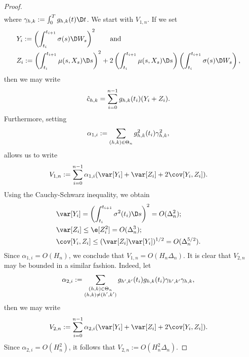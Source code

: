 \begin{proof}
\begin{align}
  \label{}
\end{align}
where $\gamma_{h,k} : = \int_0^T g_{h,k}(t) \D t$.  We start with $V_{1,n}$. If we set 
\begin{align}
  &Y_i := \left(\int^{t_{i+1}}_{t_i} \sigma(s) \D W_s\right)^2  \qquad \text{and} \notag\\
  &Z_i := \left(\int^{t_{i+1}}_{t_i} \mu(s, X_s) \D s\right)^2 + 2\left(\int^{t_{i+1}}_{t_i} \mu(s,X_s) \D s\right)\left(\int^{t_{i+1}}_{t_i} \sigma(s) \D W_s\right), \notag 
  \label{}
\end{align}
then we may write 
\begin{align}
  \hat{c}_{h,k} = \sum_{i = 0}^{n-1} g_{h,k}(t_i) (Y_i + Z_i).\notag
  \label{}
\end{align}
Furthermore, setting
\begin{align}
  \alpha_{1,i} := \sum_{(h,k) \in \Theta_n} g^2_{h,k}(t_i)\gamma_{h,k}^2,\notag
  \label{}
\end{align}
allows us to write 
\begin{align}
  V_{1,n} := \sum_{i = 0}^{n-1} \alpha_{1,i} (\var[Y_i] + \var[Z_i] + 2 \cov[Y_i,Z_i]). \notag
  \label{}
\end{align}
Using the Cauchy-Schwarz inequality, we obtain 
\begin{align}
    &\var[Y_i] = \left(\int^{t_{i+1}}_{t_i} \sigma^2(t_i) \D s\right)^2 = O(\Delta_n^2);\\
    &\var[Z_i] \le \e[Z_i^2] = O(\Delta_n^3); \\
    &\cov[Y_i, Z_i] \le (\var[Z_i] \var[Y_i])^{1/2} = O(\Delta_n^{5/2}).
\end{align}
Since $\alpha_{1,i} = O(H_n)$, we conclude that  $V_{1,n} = O(H_n\Delta_n)$. It is clear that $V_{2,n}$ may be bounded in a similar fashion. Indeed, let
\begin{align}
  \alpha_{2,i} := \sum_{\substack{(h,k) \in \Theta_n\\ (h,k) \ne (h',k')}} g_{h',k'}(t_i)g_{h,k}(t_i)\gamma_{h',k'}\gamma_{h,k},\notag
  \label{}
\end{align}
then we may write
\begin{align}
  V_{2,n} := \sum_{i = 0}^{n-1} \alpha_{2,i} (\var[Y_i] + \var[Z_i] + 2 \cov[Y_i,Z_i]). \notag
  \label{}
\end{align}
Since $ \alpha_{2,i} = O(H_n^2)$, it follows that $V_{2,n} := O(H^2_n\Delta_n)$. 
\end{proof}

